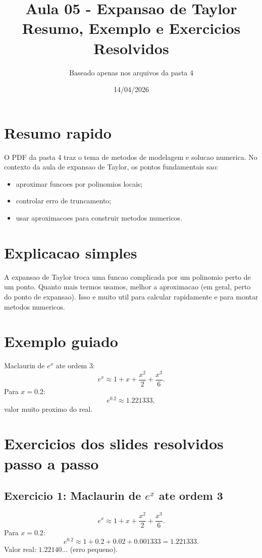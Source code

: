 \documentclass[12pt,a4paper]{article}
\title{Aula 05 - Expansao de Taylor\\Resumo, Exemplo e Exercicios Resolvidos}
\author{Baseado apenas nos arquivos da pasta 4}
\date{14/04/2026}
\begin{document}
\maketitle

\section{Resumo rapido}
O PDF da pasta 4 traz o tema de metodos de modelagem e solucao numerica. No contexto da aula de expansao de Taylor, os pontos fundamentais sao:
\begin{itemize}
  \item aproximar funcoes por polinomios locais;
  \item controlar erro de truncamento;
  \item usar aproximacoes para construir metodos numericos.
\end{itemize}

\section{Explicacao simples}
A expansao de Taylor troca uma funcao complicada por um polinomio perto de um ponto.
Quanto mais termos usamos, melhor a aproximacao (em geral, perto do ponto de expansao).
Isso e muito util para calcular rapidamente e para montar metodos numericos.

\section{Exemplo guiado}
Maclaurin de $e^x$ ate ordem 3:
\begin{equation}
e^x\approx 1+x+\frac{x^2}{2}+\frac{x^3}{6}.
\end{equation}
Para $x=0.2$:
\begin{equation}
e^{0.2}\approx 1.221333,
\end{equation}
valor muito proximo do real.

\section{Exercicios dos slides resolvidos passo a passo}
\subsection*{Exercicio 1: Maclaurin de $e^x$ ate ordem 3}
\begin{equation}
e^x \approx 1 + x + \frac{x^2}{2} + \frac{x^3}{6}.
\end{equation}
Para $x=0.2$:
\begin{equation}
e^{0.2} \approx 1 + 0.2 + 0.02 + 0.001333 = 1.221333.
\end{equation}
Valor real: $1.22140\ldots$ (erro pequeno).
\end{document}
